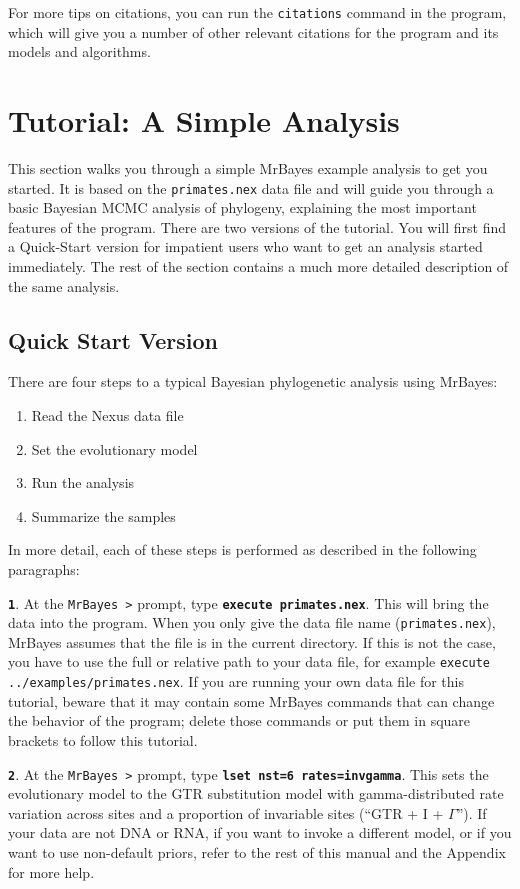 \documentclass[12pt]{book}
\newcommand{\ttt}[1]{\texttt{#1}}
\newcommand{\tb}[1]{\ttt{\textbf{#1}}}
\begin{document}
For more tips on citations, you can run the \ttt{citations} command in the program, which will give
you a number of other relevant citations for the program and its models and algorithms.


\chapter{Tutorial: A Simple Analysis}
\label{tutorialSimple}
This section walks you through a simple MrBayes example analysis to get you started. It is based on
the \ttt{primates.nex} data file and will guide you through a basic Bayesian MCMC analysis of
phylogeny, explaining the most important features of the program. There are two versions of the
tutorial. You will first find a Quick-Start version for impatient users who want to get an analysis
started immediately. The rest of the section contains a much more detailed description of the same
analysis.

\section{Quick Start Version}

There are four steps to a typical Bayesian phylogenetic analysis using MrBayes:
\begin{enumerate}
\item Read the Nexus data file
\item Set the evolutionary model
\item Run the analysis
\item Summarize the samples
\end{enumerate}

In more detail, each of these steps is performed as described in the following paragraphs:

\tb{1}. At the \ttt{MrBayes >} prompt, type \tb{execute primates.nex}. This will bring the data
into the program. When you only give the data file name (\ttt{primates.nex}), MrBayes assumes that
the file is in the current directory. If this is not the case, you have to use the full or relative
path to your data file, for example \ttt{execute ../examples/primates.nex}. If you are running your
own data file for this tutorial, beware that it may contain some MrBayes commands that can change
the behavior of the program; delete those commands or put them in square brackets to follow this
tutorial.

\tb{2}. At the \ttt{MrBayes >} prompt, type \tb{lset nst=6 rates=invgamma}. This sets the
evolutionary model to the GTR substitution model with gamma-distributed rate variation across sites
and a proportion of invariable sites (``GTR + I + $\Gamma$''). If your data are not DNA or RNA, if you
want to invoke a different model, or if you want to use non-default priors, refer to the rest of
this manual and the Appendix for more help.
\end{document}
